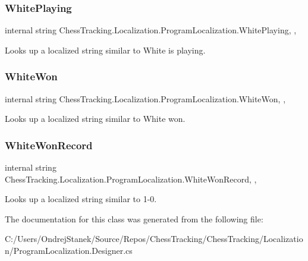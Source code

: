 \subsubsection{\texorpdfstring{WhitePlaying}{WhitePlaying}}
{\footnotesize\ttfamily internal string Chess\+Tracking.\+Localization.\+Program\+Localization.\+White\+Playing\hspace{0.3cm}{\ttfamily [static]}, {\ttfamily [get]}, {\ttfamily [private]}}



Looks up a localized string similar to White is playing. 

\mbox{\label{class_chess_tracking_1_1_localization_1_1_program_localization_abe73133baf0f6f5265eb76ff37c27d21}} 
\subsubsection{\texorpdfstring{WhiteWon}{WhiteWon}}
{\footnotesize\ttfamily internal string Chess\+Tracking.\+Localization.\+Program\+Localization.\+White\+Won\hspace{0.3cm}{\ttfamily [static]}, {\ttfamily [get]}, {\ttfamily [private]}}



Looks up a localized string similar to White won. 

\mbox{\label{class_chess_tracking_1_1_localization_1_1_program_localization_a014d45165c10308a9620e1006f8c84a0}} 
\subsubsection{\texorpdfstring{WhiteWonRecord}{WhiteWonRecord}}
{\footnotesize\ttfamily internal string Chess\+Tracking.\+Localization.\+Program\+Localization.\+White\+Won\+Record\hspace{0.3cm}{\ttfamily [static]}, {\ttfamily [get]}, {\ttfamily [private]}}



Looks up a localized string similar to 1-\/0. 



The documentation for this class was generated from the following file\+:\begin{DoxyCompactItemize}
\item 
C\+:/\+Users/\+Ondrej\+Stanek/\+Source/\+Repos/\+Chess\+Tracking/\+Chess\+Tracking/\+Localization/Program\+Localization.\+Designer.\+cs\end{DoxyCompactItemize}
